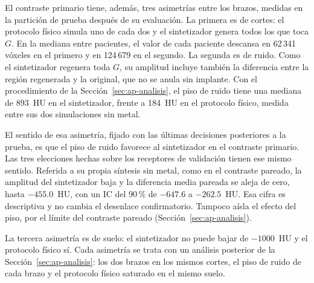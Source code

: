 El contraste primario tiene, además, tres asimetrías entre los brazos, medidas en la partición de prueba después de su evaluación. La primera es de cortes: el protocolo físico simula uno de cada dos y el sintetizador genera todos los que toca $G$. En la mediana entre pacientes, el valor de cada paciente descansa en 62\,341 vóxeles en el primero y en 124\,679 en el segundo. La segunda es de ruido. Como el sintetizador regenera toda $G$, su amplitud incluye también la diferencia entre la región regenerada y la original, que no se anula sin implante. Con el procedimiento de la Sección~\ref{sec:ap-analisis}, el piso de ruido tiene una mediana de 893~HU en el sintetizador, frente a 184~HU en el protocolo físico, medida entre sus dos simulaciones sin metal.

El sentido de esa asimetría, fijado con las últimas decisiones posteriores a la prueba, es que el piso de ruido favorece al sintetizador en el contraste primario. Las tres elecciones hechas sobre los receptores de validación tienen ese mismo sentido. Referida a su propia síntesis sin metal, como en el contraste pareado, la amplitud del sintetizador baja y la diferencia media pareada se aleja de cero, hasta $-455.0$~HU, con un IC del 90\,\% de $-647.6$ a $-262.5$~HU. Esa cifra es descriptiva y no cambia el desenlace confirmatorio. Tampoco aísla el efecto del piso, por el límite del contraste pareado (Sección~\ref{sec:ap-analisis}).

La tercera asimetría es de suelo: el sintetizador no puede bajar de $-1000$~HU y el protocolo físico sí. Cada asimetría se trata con un análisis posterior de la Sección~\ref{sec:ap-analisis}: los dos brazos en los mismos cortes, el piso de ruido de cada brazo y el protocolo físico saturado en el mismo suelo.
